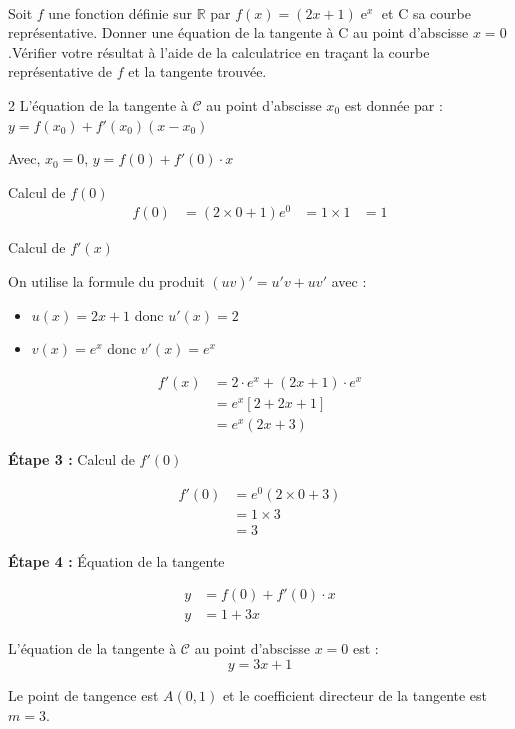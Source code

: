 \documentclass[11pt,a4paper]{article}
\DeclareMathOperator{\e}{e}
\newcommand{\cor}[1]{%
\begin{tcolorbox}[colback=red!5!white,colframe=red!75!black]
#1
\end{tcolorbox}
}
\begin{document}
\\[5 pt]
Soit $f$ une fonction définie sur $\mathbb{R}$ par $f(x)=(2x+1)\e^x$ et C sa courbe représentative. 
Donner une équation de la tangente à C au point d'abscisse $x=0$.Vérifier votre résultat à l'aide de la calculatrice en traçant la courbe représentative de $f$ et la tangente trouvée. \\[5 pt]
\cor{
\begin{multicols}{2}
  L'équation de la tangente à $\mathcal{C}$ au point d'abscisse $x_0$ est donnée par :$y = f(x_0) + f'(x_0)(x - x_0)$

Avec, $x_0 = 0$, $y = f(0) + f'(0) \cdot x$

 Calcul de $f(0)$
\begin{align*}
f(0) &= (2 \times 0 + 1)e^0 & = 1 \times 1  & = 1
\end{align*}

Calcul de $f'(x)$

On utilise la formule du produit $(uv)' = u'v + uv'$ avec :
\begin{itemize}
\item $u(x) = 2x+1$ donc $u'(x) = 2$
\item $v(x) = e^x$ donc $v'(x) = e^x$
\end{itemize}

\begin{align*}
f'(x) &= 2 \cdot e^x + (2x+1) \cdot e^x \\
&= e^x[2 + 2x + 1] \\
&= e^x(2x + 3)
\end{align*}

\textbf{Étape 3 :} Calcul de $f'(0)$

\begin{align*}
f'(0) &= e^0(2 \times 0 + 3) \\
&= 1 \times 3 \\
&= 3
\end{align*}

\textbf{Étape 4 :} Équation de la tangente

\begin{align*}
y &= f(0) + f'(0) \cdot x \\
y &= 1 + 3x
\end{align*}

\cor{
L'équation de la tangente à $\mathcal{C}$ au point d'abscisse $x=0$ est :
$$\boxed{y = 3x + 1}$$

Le point de tangence est $A(0, 1)$ et le coefficient directeur de la tangente est $m = 3$.
}
  
\end{multicols}
}
\end{document}
